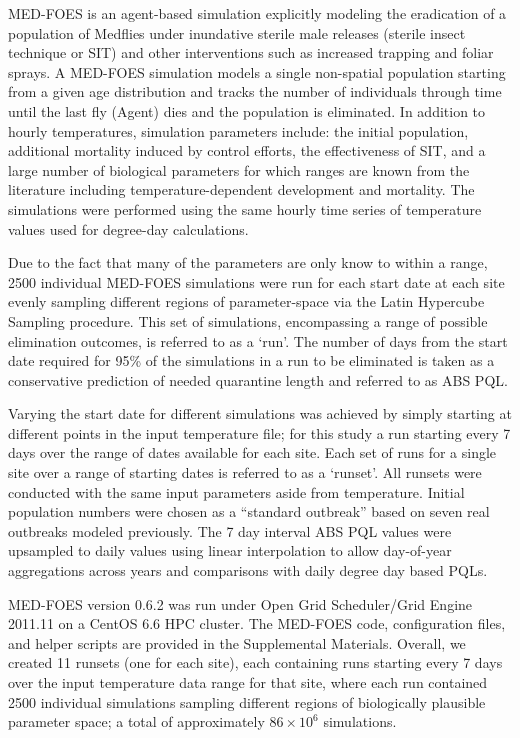 \documentclass[10pt,a4paper,twocolumn]{article}
\begin{document}
MED-FOES\cite{manoukis_computer_2014,manoukis_agent-based_2014} is 
an agent-based simulation explicitly modeling the eradication of a population of Medflies 
under inundative sterile male releases (sterile insect technique or SIT) and other interventions
such as increased trapping and foliar sprays.
A MED-FOES simulation models a single non-spatial population starting from a given age distribution 
and tracks the number of individuals through time until the last 
fly (Agent) dies and the population is eliminated.
In addition to hourly temperatures, simulation parameters include: 
the initial population, 
additional mortality induced by control efforts,
the effectiveness of SIT, 
and a large number of biological parameters for which ranges are known from 
the literature including temperature-dependent development and mortality.
The simulations were performed using the same hourly time series of temperature values 
used for degree-day calculations.

Due to the fact that many of the parameters are only know to within a range,
2500 individual MED-FOES simulations were run for each start date at each site 
evenly sampling different regions of parameter-space via the 
Latin Hypercube Sampling\cite{10.2307/1403510} procedure.
This set of simulations, encompassing a range of possible elimination outcomes, is referred to as a `run'.
The number of days from the start date required for
95\% of the simulations in a run to be eliminated is 
taken as a conservative prediction of needed quarantine length and referred to as ABS PQL.

Varying the start date for different simulations was achieved by simply 
starting at different points in the input temperature file; 
for this study a run starting every 7 days over the range of dates available for each site.
Each set of runs for a single site over a range of starting dates is referred to as a `runset'.
All runsets were conducted with the same input parameters aside from temperature.
Initial population numbers were chosen as a ``standard outbreak'' based on seven real 
outbreaks modeled previously\cite{manoukis_agent-based_2014}.
The 7 day interval ABS PQL values were upsampled to daily values using linear interpolation
to allow day-of-year aggregations across years and comparisons with daily degree day based PQLs.

MED-FOES version 0.6.2 was run under
Open Grid Scheduler/Grid Engine 2011.11 on a CentOS 6.6 HPC cluster.
The MED-FOES code, configuration files, and helper scripts are provided in the Supplemental Materials.
Overall, we created 11 runsets (one for each site), 
each containing runs starting every 7 days over the input temperature data range for that site,
where each run contained 2500 individual simulations sampling different regions of 
biologically plausible parameter space; 
a total of approximately $86{\times}10^6$ simulations.
\end{document}
